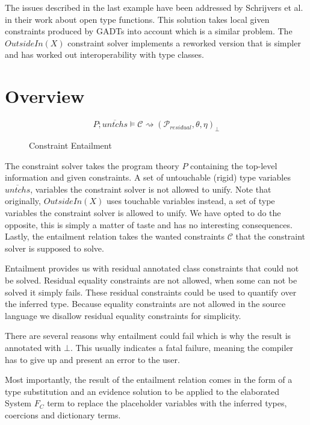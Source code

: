 The issues described in the last example have been addressed by Schrijvers et
al.~\cite{type-checking-with-open-type-functions} in their work about open type
functions. This solution takes local given constraints produced by GADTs into
account which is a similar problem. The $OutsideIn(X)$ constraint solver
implements a reworked version that is simpler and has worked out
interoperability with type classes.

\section{Overview}

\begin{figure}
$$
P ; \overline{untchs} \vDash \mathcal{C} \rightsquigarrow
(\mathcal{P}_{residual}, \theta, \eta)_\bot
$$
\caption{Constraint Entailment}
\label{fig:entail}
\end{figure}

The constraint solver takes the program theory $P$ containing the top-level
information and given constraints. A set of untouchable (rigid) type variables
$\overline{untchs}$, variables the constraint solver is not allowed to unify.
Note that originally, $OutsideIn(X)$ uses touchable variables instead, a set of
type variables the constraint solver is allowed to unify. We have opted to do
the opposite, this is simply a matter of taste and has no interesting
consequences.  Lastly, the entailment relation takes the wanted constraints
$\mathcal{C}$ that the constraint solver is supposed to solve.


Entailment provides us with residual annotated class constraints that could not
be solved. Residual equality constraints are not allowed, when some can not be
solved it simply fails. These residual constraints could be used to quantify
over the inferred type. Because equality constraints are not allowed in the
source language we disallow residual equality constraints for simplicity.

There are several reasons why entailment could fail which is why the result is
annotated with $\bot$. This usually indicates a fatal failure, meaning the
compiler has to give up and present an error to the user.

Most importantly, the result of the entailment relation comes in the form of a
type substitution and an evidence solution to be applied to the elaborated
System $F_C$ term to replace the placeholder variables with the inferred types,
coercions and dictionary terms.

